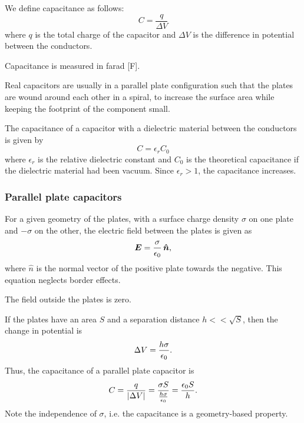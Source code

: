     We define capacitance as follows:
    \begin{equation}
        C = \frac{q}{\Delta V}
    \end{equation}
    where $q$ is the total charge of the capacitor and $\Delta V$ is the difference in potential between the conductors.
    
    Capacitance is measured in farad [F].
    
    Real capacitors are usually in a parallel plate configuration such that the plates are wound around each other in a spiral, 
    to increase the surface area while keeping the footprint of the component small.
    
    The capacitance of a capacitor with a dielectric material between the conductors is given by
    \begin{equation}
        C = \epsilon_rC_0
    \end{equation}
    where $\epsilon_r$ is the relative dielectric constant and $C_0$ is the theoretical capacitance 
    if the dielectric material had been vacuum. Since $\epsilon_r > 1$, the capacitance increases.
    
    \subsubsection{Parallel plate capacitors}
        For a given geometry of the plates, with a surface charge density $\sigma$ on one plate and $-\sigma$ on the other, 
        the electric field between the plates is given as 
        \begin{equation}
            \E = \frac{\sigma}{\e}\,\hat{n},
        \end{equation}
        where $\hat{n}$ is the normal vector of the positive plate towards the negative. This equation neglects border effects.
        
        The field outside the plates is zero.
        
        If the plates have an area $S$ and a separation distance $h << \sqrt{S}$, then the change in potential is
        \begin{equation}
            \Delta V = \frac{h\sigma}{\epsilon_0}.
        \end{equation}
        Thus, the capacitance of a parallel plate capacitor is
        \begin{equation}
            C = \frac{q}{|\Delta V|} = \frac{\sigma S}{\frac{h\sigma}{\epsilon_0}} = \frac{\epsilon_0 S}{h}.
        \end{equation}
        Note the independence of $\sigma$, i.e. the capacitance is a geometry-based property.

